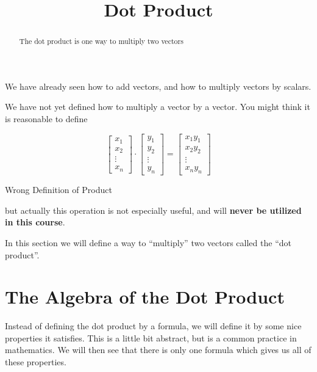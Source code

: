 \documentclass{ximera}
\title[Dig-In:]{Dot Product}
\begin{document}
\begin{abstract}
  The dot product is one way to multiply two vectors
\end{abstract}
\maketitle



We have already seen how to add vectors, and how to multiply vectors by scalars.

\begin{warning}
We have not yet defined how to multiply a vector by a vector.  You might think it is reasonable to define 


\[
\begin{bmatrix}x_1\\x_2\\\vdots\\x_n\end{bmatrix} \cdot  \begin{bmatrix}y_1\\y_2\\\vdots\\y_n\end{bmatrix}=\begin{bmatrix}x_1y_1\\x_2y_2\\\vdots\\x_ny_n\end{bmatrix}
\] 
\begin{center}
	\Large{Wrong Definition of Product}
\end{center}

but actually this operation is not especially useful, and will \textbf{never be utilized in this course}.  
\end{warning}

In this section we will define a way to ``multiply'' two vectors called the ``dot product''.

\section{The Algebra of the Dot Product}
Instead of defining the dot product by a formula, we will define it by some nice properties it satisfies.  This is a little bit abstract, but is a common practice in mathematics.  We will then see that there is only one formula which gives us all of these properties.
\end{document}
